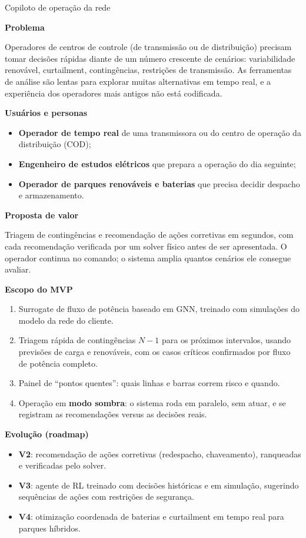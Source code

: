 \documentclass[11pt,a4paper]{article}
\newcommand{\prodsec}[1]{\par\medskip\noindent\textbf{\color{prodcolor}#1}\par\smallskip}
\begin{document}
\begin{produto}{Copiloto de operação da rede}

\prodsec{Problema}
Operadores de centros de controle (de transmissão ou de distribuição)
precisam tomar decisões rápidas diante de um número crescente de cenários:
variabilidade renovável, curtailment, contingências, restrições de
transmissão. As ferramentas de análise são lentas para explorar muitas
alternativas em tempo real, e a experiência dos operadores mais antigos não
está codificada.

\prodsec{Usuários e personas}
\begin{itemize}
  \item \textbf{Operador de tempo real} de uma transmissora ou do centro de
    operação da distribuição (COD);
  \item \textbf{Engenheiro de estudos elétricos} que prepara a operação do dia
    seguinte;
  \item \textbf{Operador de parques renováveis e baterias} que precisa decidir
    despacho e armazenamento.
\end{itemize}

\prodsec{Proposta de valor}
Triagem de contingências e recomendação de ações corretivas em segundos, com
cada recomendação verificada por um solver físico antes de ser apresentada.
O operador continua no comando; o sistema amplia quantos cenários ele
consegue avaliar.

\prodsec{Escopo do MVP}
\begin{enumerate}
  \item Surrogate de fluxo de potência baseado em GNN, treinado com
    simulações do modelo da rede do cliente.
  \item Triagem rápida de contingências $N-1$ para os próximos intervalos,
    usando previsões de carga e renováveis, com os casos críticos
    confirmados por fluxo de potência completo.
  \item Painel de ``pontos quentes'': quais linhas e barras correm risco e
    quando.
  \item Operação em \textbf{modo sombra}: o sistema roda em paralelo, sem atuar,
    e se registram as recomendações versus as decisões reais.
\end{enumerate}

\prodsec{Evolução (roadmap)}
\begin{itemize}
  \item \textbf{V2}: recomendação de ações corretivas (redespacho,
    chaveamento), ranqueadas e verificadas pelo solver.
  \item \textbf{V3}: agente de RL treinado com decisões históricas e em
    simulação, sugerindo sequências de ações com restrições de segurança.
  \item \textbf{V4}: otimização coordenada de baterias e curtailment em
    tempo real para parques híbridos.
\end{itemize}


\end{produto}
\end{document}
